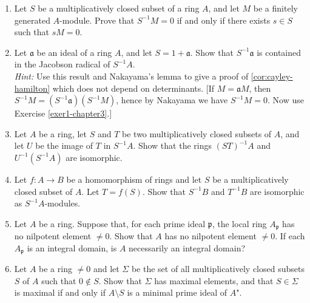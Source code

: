 
\begin{enumerate}
    \item \label{exer1-chapter3}Let $S$ be a multiplicatively closed subset of a ring $A$, and let $M$ be a finitely generated $A$-module. Prove that $S^{-1}M = 0$ if and only if there exists $s \in S$ such that $sM = 0$.

    \item \label{exer2-chapter3}Let $\mathfrak{a}$ be an ideal of a ring $A$, and let $S = 1 + \mathfrak{a}$. Show that $S^{-1}\mathfrak{a}$ is contained in the Jacobson radical of $S^{-1}A$.\\
    \textit{Hint:} Use this result and Nakayama's lemma to give a proof of \eqref{cor:cayley-hamilton} which does not depend on determinants. [If $M = \mathfrak{a}M$, then $S^{-1}M = (S^{-1}\mathfrak{a})(S^{-1}M)$, hence by Nakayama we have $S^{-1}M = 0$. Now use Exercise \ref{exer1-chapter3}.]

    \item \label{exer3-chapter3}Let $A$ be a ring, let $S$ and $T$ be two multiplicatively closed subsets of $A$, and let $U$ be the image of $T$ in $S^{-1}A$. Show that the rings $(ST)^{-1}A$ and $U^{-1}(S^{-1}A)$ are isomorphic.

    \item \label{exer4-chapter3}Let $f \colon A \to B$ be a homomorphism of rings and let $S$ be a multiplicatively closed subset of $A$. Let $T = f(S)$. Show that $S^{-1}B$ and $T^{-1}B$ are isomorphic as $S^{-1}A$-modules.

    \item \label{exer5-chapter3}Let $A$ be a ring. Suppose that, for each prime ideal $\mathfrak{p}$, the local ring $A_{\mathfrak{p}}$ has no nilpotent element $\neq 0$. Show that $A$ has no nilpotent element $\neq 0$. If each $A_{\mathfrak{p}}$ is an integral domain, is $A$ necessarily an integral domain?

    \item \label{exer6-chapter3}Let $A$ be a ring $\neq 0$ and let $\Sigma$ be the set of all multiplicatively closed subsets $S$ of $A$ such that $0 \notin S$. Show that $\Sigma$ has maximal elements, and that $S \in \Sigma$ is maximal if and only if $A \setminus S$ is a minimal prime ideal of $A$".


\end{enumerate}
